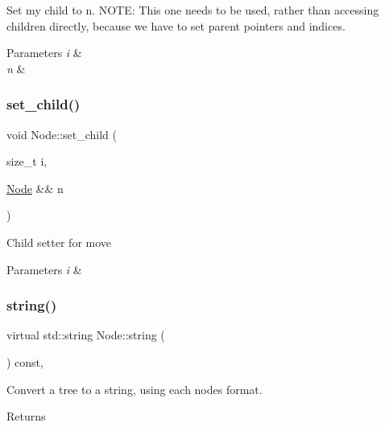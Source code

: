 Set my child to n. N\+O\+TE\+: This one needs to be used, rather than accessing children directly, because we have to set parent pointers and indices. 
\begin{DoxyParams}{Parameters}
{\em i} & \\
\hline
{\em n} & \\
\hline
\end{DoxyParams}
\mbox{\label{class_node_a486882370d2c9592c6eabb52a3289253}} 
\subsubsection{\texorpdfstring{set\+\_\+child()}{set\_child()}\hspace{0.1cm}{\footnotesize\ttfamily [2/2]}}
{\footnotesize\ttfamily void Node\+::set\+\_\+child (\begin{DoxyParamCaption}\item[{size\+\_\+t}]{i,  }\item[{\hyperlink{class_node}{Node} \&\&}]{n }\end{DoxyParamCaption})\hspace{0.3cm}{\ttfamily [inline]}}

Child setter for move 
\begin{DoxyParams}{Parameters}
{\em i} & \\
\hline
\end{DoxyParams}
\mbox{\label{class_node_a0590ae269543416be9c4ebdf70bad73b}} 
\subsubsection{\texorpdfstring{string()}{string()}}
{\footnotesize\ttfamily virtual std\+::string Node\+::string (\begin{DoxyParamCaption}{ }\end{DoxyParamCaption}) const\hspace{0.3cm}{\ttfamily [inline]}, {\ttfamily [virtual]}}

Convert a tree to a string, using each node\textquotesingle{}s format. \begin{DoxyReturn}{Returns}

\end{DoxyReturn}
\mbox{\label{class_node_ac91282056a0df2835f1579bdd21c93e1}} 
